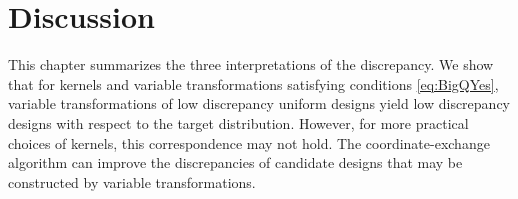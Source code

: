 \documentclass[graybox]{svmult}
\newcommand{\figdir}{code/} %
\begin{document}
\begin{comment}
To further evaluate the performance of the normal random sequence generated by the four generators, we consider the integral approximation problem in \eqref{eq:badexample} with $d=10$. We use the Monte Carlo estimate with the sample generated by SOBOL of size $n = 2^{17}$ as an accurate estimate of the integral, and summarize the integral estimation error according to the four generators with simulation size $N=512$ in Figure \ref{fig:comparison_integral}. Not surprisingly, CE outperforms the other three generators and has no explosive relative error. It's interesting to observe that SOBOL and E-SOBOL may perform even worse than RAND in several cases, and this aligns with our discussion in Section 4: the inverse transformed low uniform discrepancy sequence may not retain low normal discrepancy. When the sample size $N$ is small/moderate relative to dimension $d$, using CE would limit the potential danger of very inaccurate estimate caused by a sample with a large normal discrepancy.



\begin{figure}[ht]
\centering
{\subfigure[$d=2,N=32$] {\texttt{[image: \\figdir errorboxplot\_d2n32.eps]}}}
\quad
{\subfigure [$d=3, N=64$]
{\texttt{[image: \\figdir errorboxplot\_d3n64.eps]}}}
\quad
{\subfigure[$d=4, N=64$] {\texttt{[image: \\figdir errorboxplot\_d4n64.eps]}}}
\quad
{\subfigure[$d=6, N=128$] {\texttt{[image: \\figdir errorboxplot\_d6n128.eps]}}}
\quad
{\subfigure[$d=8, N=256$] {\texttt{[image: \\figdir errorboxplot\_d8n256.eps]}}}
\quad
{\subfigure[$d=10, N=512$] {\texttt{[image: \\figdir errorboxplot\_d10n512.eps]}}}
\caption{Integral Approximate Performance Comparison of Generators}
\end{figure}
\end{comment}


\section{Discussion} \label{sec:discussion}

This chapter summarizes the three interpretations of the discrepancy. We show that for kernels and variable transformations satisfying conditions \eqref{eq:BigQYes}, variable transformations of low discrepancy uniform designs yield low discrepancy designs with respect to the target distribution.  However, for more practical choices of kernels, this correspondence may not hold.  The coordinate-exchange algorithm can improve the discrepancies of candidate designs that may be constructed by variable transformations. 
\end{document}
